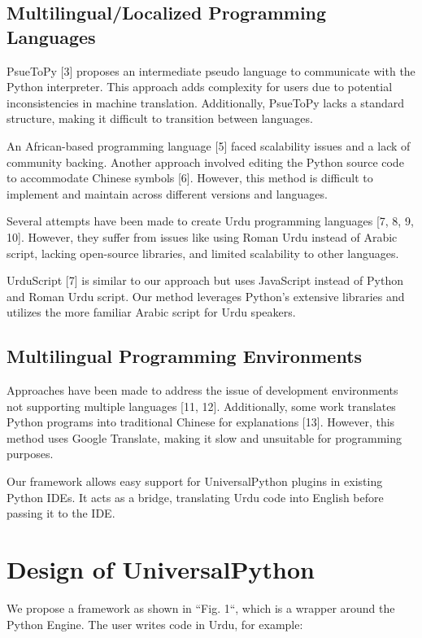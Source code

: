 \documentclass[conference]{IEEEtran}
\begin{document}
\subsection{Multilingual/Localized Programming Languages}

PsueToPy [3] proposes an intermediate pseudo language to communicate with the Python interpreter. This approach adds complexity for users due to potential inconsistencies in machine translation. Additionally, PsueToPy lacks a standard structure, making it difficult to transition between languages. 

An African-based programming language [5] faced scalability issues and a lack of community backing. Another approach involved editing the Python source code to accommodate Chinese symbols [6]. However, this method is difficult to implement and maintain across different versions and languages.

Several attempts have been made to create Urdu programming languages [7, 8, 9, 10]. However, they suffer from issues like using Roman Urdu instead of Arabic script, lacking open-source libraries, and limited scalability to other languages.

UrduScript [7] is similar to our approach but uses JavaScript instead of Python and Roman Urdu script. Our method leverages Python's extensive libraries and utilizes the more familiar Arabic script for Urdu speakers.

\subsection{Multilingual Programming Environments}

Approaches have been made to address the issue of development environments not supporting multiple languages [11, 12]. Additionally, some work translates Python programs into traditional Chinese for explanations [13]. However, this method uses Google Translate, making it slow and unsuitable for programming purposes.

Our framework allows easy support for UniversalPython plugins in existing Python IDEs. It acts as a bridge, translating Urdu code into English before passing it to the IDE.

\section{Design of UniversalPython}

We propose a framework as shown in “Fig. 1“, which is a wrapper around the Python Engine. The user writes code in Urdu, for example:
\end{document}
